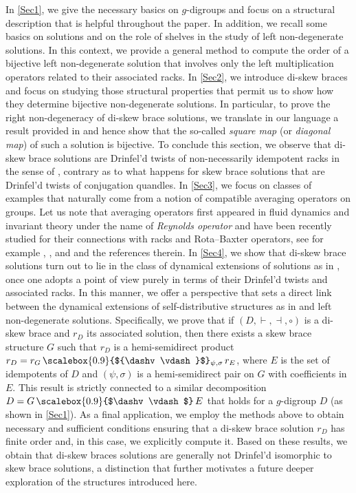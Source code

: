 \documentclass[preprint,1p]{elsarticle}
\numberwithin{equation}{section}
\theoremstyle{definition}               %
\newcommand{\vd}{\vdash}
\newcommand{\dv}{\dashv}
\begin{document}
In \cref{Sec1}, we give the necessary basics on $g$-digroups and focus on a structural description that is helpful throughout the paper. In addition, we recall some basics on solutions and on the role of shelves in the study of left non-degenerate solutions.
In this context, we provide a general method to compute the order of a bijective left non-degenerate solution that involves only the left multiplication operators related to their associated racks. 
In \cref{Sec2}, we introduce di-skew braces and focus on studying those structural properties that permit us to show how they determine bijective non-degenerate solutions. 
In particular, to prove the right non-degeneracy of di-skew brace solutions, we translate in our language a result provided in \cite{Ru19} and hence show that the so-called \emph{square map} (or \emph{diagonal map}) of such a solution is bijective.
To conclude this section, we observe that di-skew brace solutions are Drinfel'd twists of non-necessarily idempotent racks in the sense of \cite{DoRySte24}, contrary as to what happens for skew brace solutions that are Drinfel'd twists of conjugation quandles.
In \cref{Sec3}, we focus on classes of examples that naturally come from a notion of compatible averaging operators on groups.
Let us note that averaging operators first appeared in fluid dynamics and invariant theory under the name of \emph{Reynolds operator} and have been recently studied for their connections with racks and Rota--Baxter operators, see for example \cite{Bar24x}, \cite{ChMa25x}, \cite{Das24x} and \cite{ZhGa24x} and the references therein. 
In \cref{Sec4}, we show that di-skew brace solutions turn out to lie in the class of dynamical extensions of solutions as in \cite{CasCatSte22}, once one adopts a point of view purely in terms of their Drinfel'd twists and associated racks.
In this manner, we offer a perspective that sets a direct link between the dynamical extensions of self-distributive structures as in \cite{AndGr03} and left non-degenerate solutions.
Specifically, we prove that if $(D,\vd,\dv,\circ)$ is a di-skew brace and $r_D$ its associated solution, then there exists a skew brace structure $G$ such that $r_D$ is a hemi-semidirect product $r_D = r_G \,\text{\scalebox{0.9}{${\dv\vd}$}$_{\psi,\sigma}$}\, r_E$, where $E$ is the set of idempotents of $D$ and $(\psi,\sigma)$ is a hemi-semidirect pair on $G$ with coefficients in $E$. This result is strictly connected to a similar decomposition  $D = G \,\text{\scalebox{0.9}{$\dv\vd$}}\, E$ that holds for a $g$-digroup $D$ (as shown in \cref{Sec1}).
As a final application, we employ the methods above to obtain necessary and sufficient conditions ensuring that a di-skew brace solution $r_D$ has finite order and, in this case, we explicitly compute it. Based on these results, we obtain that di-skew braces solutions are generally not Drinfel'd isomorphic to skew brace solutions, a distinction that further motivates a future deeper exploration of the structures introduced here.
\end{document}
